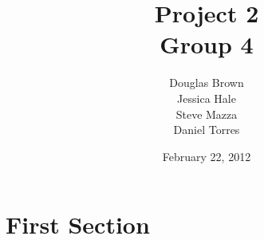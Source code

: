 \documentclass[letterpaper,12pt]{article}
\title{Project 2 \\ \large Group 4}
\author{Douglas Brown \\ Jessica Hale \\ Steve Mazza \\ Daniel Torres}
\date{February 22, 2012}
\begin{document}
\maketitle
\tableofcontents
\listoffigures
\listoftables
\pagebreak

\section{First Section}
\end{document}
